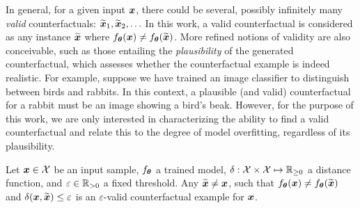 
In general, for a given input $\boldsymbol{x}$, there could be several, possibly infinitely many \textit{valid} counterfactuals: $\widetilde{\boldsymbol{x}}_1, \widetilde{\boldsymbol{x}}_2, \ldots$ In this work, a valid counterfactual is considered as any instance $\widetilde{\boldsymbol{x}}$ where $f_{\boldsymbol{\theta}}(\boldsymbol{x}) \neq f_{\boldsymbol{\theta}}(\widetilde{\boldsymbol{x}})$. More refined notions of validity are also conceivable, such as those entailing the \textit{plausibility} of the generated counterfactual, which assesses whether the counterfactual example is indeed realistic. For example, suppose we have trained an image classifier to distinguish between birds and rabbits. In this context, a plausible (and valid) counterfactual for a rabbit must be an image showing a bird's beak.
However, for the purpose of this work, we are only interested in characterizing the ability to find a valid counterfactual and relate this to the degree of model overfitting, regardless of its plausibility.

\begin{definition} Let $\boldsymbol{x} \in \mathcal{X}$ be an input sample, $f_{\boldsymbol{\theta}}$ a trained model, $\delta:\mathcal{X}\times \mathcal{X} \mapsto \mathbb{R}_{\geq 0}$ a distance function, and $\varepsilon \in \mathbb{R}_{>0}$ a fixed threshold. Any $\widetilde{\boldsymbol{x}}\neq \boldsymbol{x}$, such that $f_{\boldsymbol{\theta}}(\boldsymbol{x}) \neq f_{\boldsymbol{\theta}}(\widetilde{\boldsymbol{x}})$ and $\delta(\boldsymbol{x}, \widetilde{\boldsymbol{x}}) \leq \varepsilon$ is an $\varepsilon$-valid counterfactual example for $\boldsymbol{x}$.
\end{definition}

